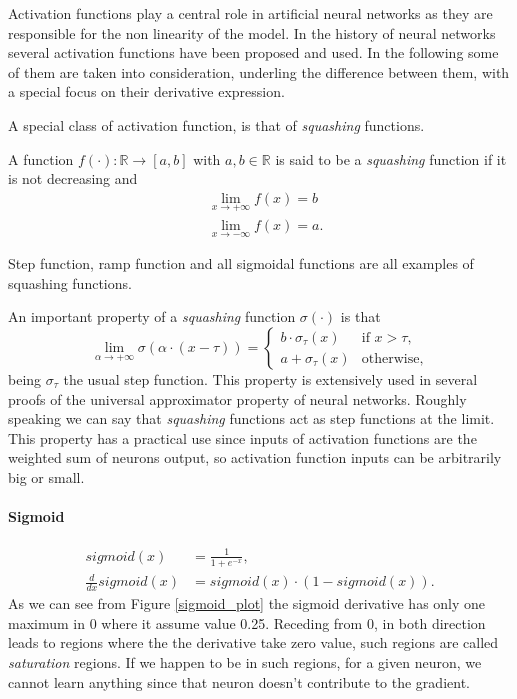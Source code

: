 Activation functions play a central role in artificial neural networks as they are responsible for the non linearity of the model.
In the history of neural networks several activation functions have been proposed and used. In the following some of them are taken into consideration,
underling the difference between them, with a special focus on their derivative expression.

A special class of activation function, is that of \textit{squashing} functions.

\begin{defn}
A function $f(\cdot):\mathbb{R}\rightarrow[a,b]$ with $a,b \in \mathbb{R}$ is said to be a \textit{squashing} function if it is not decreasing and 
\begin{align}
&\lim_{x \to +\infty} f(x) = b \\
&\lim_{x \to -\infty} f(x) = a.
\end{align}
\end{defn}
Step function, ramp function and all sigmoidal functions are all examples of squashing functions.

\begin{remark}
An important property of a \textit{squashing} function $\sigma(\cdot)$ is that
\begin{equation}
 \lim_{\alpha \to +\infty} \sigma(\alpha\cdot (x-\tau))= 
 \begin{cases}
    b \cdot \sigma_{\tau}(x) & \text{if $x> \tau $},\\
    a + \sigma_{\tau}(x) & \text{otherwise},
  \end{cases}
\end{equation}
being $\sigma_{\tau}$ the usual step function.
This property is extensively used in several proofs of the universal approximator property of neural networks. Roughly speaking we can say that \textit{squashing} functions act as step functions
at the limit. This property has a practical use since inputs of activation functions are the weighted sum of neurons output,
so activation function inputs can be arbitrarily big or small.
\end{remark}


\paragraph{Sigmoid}

\begin{align}
sigmoid(x)&= \frac{1}{1+e^{-x}},  \\ 
\frac{d}{dx}sigmoid(x)&= sigmoid(x) \cdot (1-sigmoid(x)).
\end{align}
As we can see from Figure \ref{sigmoid_plot} the sigmoid derivative has only one maximum in 0 where it assume value 0.25. Receding from 0, in both direction leads to regions where
the the derivative take zero value, such regions are called \textit{saturation} regions. If we happen to be in such regions, for a given neuron, we cannot learn anything since that neuron doesn't contribute
to the gradient.

